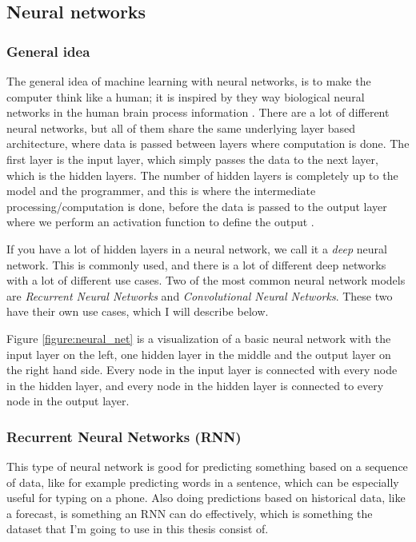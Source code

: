\subsection{Neural networks}
\subsubsection{General idea}
The general idea of machine learning with neural networks, is to make the computer think like a human; it is inspired by they way biological 
neural networks in the human brain process information \cite{neural_networks_0}. There are a lot of different neural networks, but all of them 
share the same underlying layer based architecture, where data is passed between layers where computation is done. The first layer is the input layer, 
which simply passes the data to the next layer, which is the hidden layers. The number of hidden layers is completely up to the model and the programmer, 
and this is where the intermediate processing/computation is done, before the data is passed to the output layer where we perform an activation function 
to define the output \cite{neural_networks_1}.

If you have a lot of hidden layers in a neural network, we call it a \textit{deep} neural network. This 
is commonly used, and there is a lot of different deep networks with a lot of different use cases. Two of the most common
neural network models are \textit{Recurrent Neural Networks} and \textit{Convolutional Neural Networks}. These two have their own use cases, 
which I will describe below.

Figure \ref{figure:neural_net} is a visualization of a basic neural network with the input layer on the left,
one hidden layer in the middle and the output layer on the right hand side. Every node in the input layer is connected with every node in the hidden layer,
and every node in the hidden layer is connected to every node in the output layer.

\subsubsection{Recurrent Neural Networks (RNN)}
This type of neural network is good for predicting something based on a sequence of data, like for example predicting words in a sentence, which 
can be especially useful for typing on a phone. Also doing predictions based on historical data, like a forecast, is something an RNN can do effectively, 
which is something the dataset that I'm going to use in this thesis consist of. 

